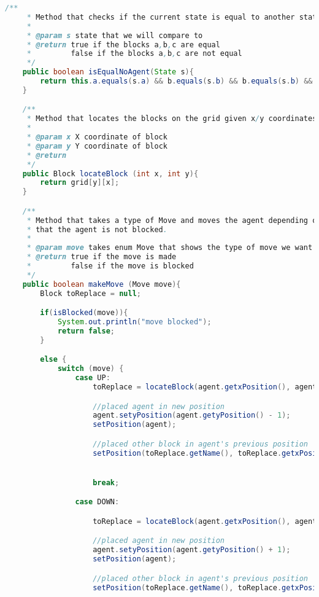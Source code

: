 \documentclass[a4paper, 11pt]{article} %
\begin{document}
\begin{lstlisting}[language=java]
    /**
     * Method that checks if the current state is equal to another state excluding the agent
     *
     * @param s state that we will compare to
     * @return true if the blocks a,b,c are equal
     *         false if the blocks a,b,c are not equal
     */
    public boolean isEqualNoAgent(State s){
        return this.a.equals(s.a) && b.equals(s.b) && b.equals(s.b) && c.equals(s.c);
    }

    /**
     * Method that locates the blocks on the grid given x/y coordinates
     *
     * @param x X coordinate of block
     * @param y Y coordinate of block
     * @return
     */
    public Block locateBlock (int x, int y){
        return grid[y][x];
    }

    /**
     * Method that takes a type of Move and moves the agent depending on the type of move after checking
     * that the agent is not blocked.
     *
     * @param move takes enum Move that shows the type of move we want to perform
     * @return true if the move is made
     *         false if the move is blocked
     */
    public boolean makeMove (Move move){
        Block toReplace = null;

        if(isBlocked(move)){
            System.out.println("move blocked");
            return false;
        }

        else {
            switch (move) {
                case UP:
                    toReplace = locateBlock(agent.getxPosition(), agent.getyPosition() - 1);

                    //placed agent in new position
                    agent.setyPosition(agent.getyPosition() - 1);
                    setPosition(agent);

                    //placed other block in agent's previous position
                    setPosition(toReplace.getName(), toReplace.getxPosition(), toReplace.getyPosition() + 1);


                    break;

                case DOWN:

                    toReplace = locateBlock(agent.getxPosition(), agent.getyPosition() + 1);

                    //placed agent in new position
                    agent.setyPosition(agent.getyPosition() + 1);
                    setPosition(agent);

                    //placed other block in agent's previous position
                    setPosition(toReplace.getName(), toReplace.getxPosition(), toReplace.getyPosition() - 1);


\end{lstlisting}
\end{document}
